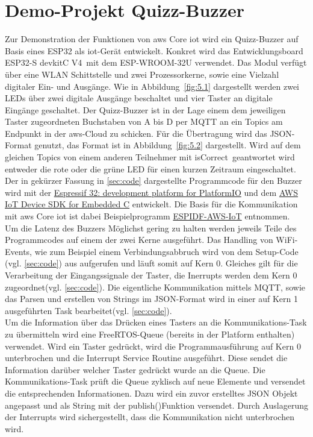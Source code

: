 \section{Demo-Projekt Quizz-Buzzer}\label{sec:5.2}
Zur Demonstration der Funktionen von \acrshort{aws} Core \acrshort{iot} wird ein Quizz-Buzzer auf Basis eines ESP32 als \acrshort{iot}-Gerät entwickelt. Konkret wird das Entwicklungsboard \glqq{}ESP32-S devkitC V4\grqq\ mit dem ESP-WROOM-32U verwendet. Das Modul verfügt über eine WLAN Schittstelle und zwei Prozessorkerne, sowie eine Vielzahl digitaler Ein- und Ausgänge. Wie in Abbildung~\autoref{fig:5.1} dargestellt werden zwei LEDs über zwei digitale Ausgänge beschaltet und vier Taster an digitale Eingänge geschaltet.
\FloatBarrier
Der Quizz-Buzzer ist in der Lage einem dem jeweiligen Taster zugeordneten Buchstaben von A bis D per MQTT an ein \Gls{Topics} am Endpunkt in der \acrshort{aws}-Cloud zu schicken. Für die Übertragung wird das JSON-Format genutzt, das Format ist in Abbildung~\autoref{fig:5.2} dargestellt. Wird auf dem gleichen \Gls{Topics} von einem anderen Teilnehmer mit \glqq{}isCorrect\grqq\ geantwortet wird entweder die rote oder die grüne LED für einen kurzen Zeitraum eingeschaltet.\\ Der in gekürzer Fassung in \autoref{sec:code} dargestellte Programmcode für den Buzzer wird mit der \href{https://github.com/platformio/platform-espressif32/tree/master}{Espressif 32: development platform for PlatformIO} und dem \href{https://github.com/aws/aws-iot-device-sdk-embedded-C}{AWS IoT Device SDK for Embedded C} entwickelt. Die Basis für die Kommunikation mit \acrshort{aws} Core \acrshort{iot} ist dabei Beispielprogramm \href{https://github.com/platformio/platform-espressif32/tree/master/examples/espidf-aws-iot}{ESPIDF-AWS-IoT} entnommen.\\ Um die Latenz des Buzzers Möglichst gering zu halten werden jeweils Teile des Programmcodes auf einem der zwei Kerne ausgeführt. Das Handling von WiFi-Events, wie zum Beispiel einem Verbindungsabbruch wird von dem Setup-Code (vgl. \autoref{sec:code}) aus aufgerufen und läuft somit auf Kern 0. Gleiches gilt für die Verarbeitung der Eingangssignale der Taster, die Inerrupts werden dem Kern 0 zugeordnet(vgl. \autoref{sec:code}). Die eigentliche Kommunikation mittels MQTT, sowie das Parsen und erstellen von Strings im JSON-Format wird in einer auf Kern 1 ausgeführten Task bearbeitet(vgl. \autoref{sec:code}).\\
Um die Information über das Drücken eines Tasters an die Kommunikations-Task zu übermitteln wird eine FreeRTOS-Queue (bereits in der Platform enthalten) verwendet. Wird ein Taster gedrückt, wird die Programmausführung auf Kern 0 unterbrochen und die Interrupt Service Routine ausgeführt. Diese sendet die Information darüber welcher Taster gedrückt wurde an die Queue. Die Kommunikations-Task prüft die Queue zyklisch auf neue Elemente und versendet die entsprechenden Informationen. Dazu wird ein zuvor erstelltes JSON Objekt angepasst und als String mit der \glqq{}publish()\grqq\-Funktion versendet. Durch Auslagerung der Interrupts wird sichergestellt, dass die Kommunikation nicht unterbrochen wird.\FloatBarrier